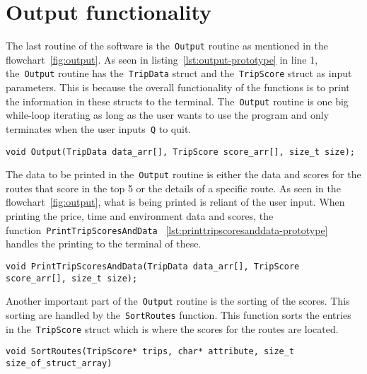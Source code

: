 \section{Output functionality}\label{sec:output-functionality}

The last routine of the software is the~\texttt{Output} routine as mentioned in the flowchart~\ref{fig:output}.
As seen in listing~\ref{lst:output-prototype} in line 1, the~\texttt{Output} routine has the~\texttt{TripData} struct
and the~\texttt{TripScore} struct as input parameters.
This is because the overall functionality of the functions is to print the information in these structs to the terminal.
The~\texttt{Output} routine is one big while-loop iterating as long as the user wants to use the program and only
terminates when the user inputs~\texttt{Q} to quit.

\begin{lstlisting}[caption={Function prototype for~\texttt{Output}}, label={lst:output-prototype}]
void Output(TripData data_arr[], TripScore score_arr[], size_t size);
\end{lstlisting}

The data to be printed in the~\texttt{Output} routine is either the data and scores for the routes that score in the top
5 or the details of a specific route.
As seen in the flowchart~\ref{fig:output}, what is being printed is reliant of the user input.
When printing the price, time and environment data and scores, the function~\texttt{PrintTripScoresAndData}
~\ref{lst:printtripscoresanddata-prototype} handles the printing to the terminal of these.

\begin{lstlisting}[caption={Function prototype for~\texttt{PrintTripScoresAndData}}, label={lst:printtripscoresanddata-prototype}]
void PrintTripScoresAndData(TripData data_arr[], TripScore score_arr[], size_t size);
\end{lstlisting}


Another important part of the~\texttt{Output} routine is the sorting of the scores.
This sorting are handled by the~\texttt{SortRoutes} function.
This function sorts the entries in the~\texttt{TripScore} struct which is where the scores for the routes are located.


\begin{lstlisting}[caption={Function prototype for~\texttt{SortRoutes}}, label={lst:sortroutes-prototype}]
void SortRoutes(TripScore* trips, char* attribute, size_t size_of_struct_array)
\end{lstlisting}
